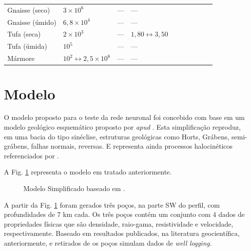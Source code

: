 \begin{table}[H]
\begin{tabular}{@{}llllllllll@{}}
		Gnaisse (seco) & $3\times10^{6}$          &         ---      &     ---       &   \\
		Gnaisse (úmido) &   $6,8\times10^{4}$        &       ---        &      ---      &   \\
		Tufa (seca) &      $2\times10^{3}$     &      ---         &     $1,80\leftrightarrow3,50$       &     \\
		Tufa (úmida) &     $10^{5}$      &     ---          &     ---       &      \\
		Mármore &  $10^{2}\leftrightarrow2,5\times10^{8}$         &       ---        &      ---      &    \\ \bottomrule
	\end{tabular}
\end{table}

 

\section{Modelo}

O modelo proposto para o teste da rede neuronal foi concebido com base em um modelo geológico esquemático proposto por  \citet{Sal2008} \textit{apud} \citep{Eiras1996}. Esta simplificação reproduz, em uma bacia do tipo sinéclise, estruturas geológicas como Horts, Grábens, semi-grábens, falhas normais, reversas. E representa ainda processos halocinéticos referenciados por \cite{Eiras1996}.

A Fig. \ref{modelo} representa o modelo em tratado anteriormente. 

\begin{figure}[H]
	\centering
	\setlength{\fboxsep}{8pt}
	\setlength{\fboxrule}{0.1pt}
	\caption{Modelo Simplificado baseado em \cite{Sal2008}.}
	\label{modelo}
\end{figure}

A partir da Fig. \ref{modelo} foram gerados três poços, na parte SW do perfil, com profundidades de $7$ km cada. Os três poços contém um conjunto com $4$ dados de propriedades físicas que são densidade, raio-gama, resistividade e velocidade, respectivamente. Baseado em resultados publicados, na literatura geocientífica, anteriormente, e retirados de \citet{Telford_1993} os poços simulam dados de \textit{well logging}.

